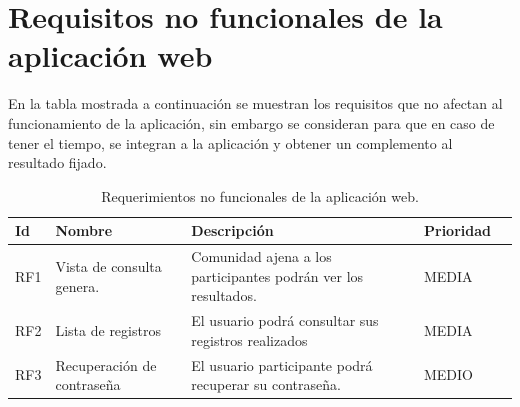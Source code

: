 \section{Requisitos no funcionales de la aplicación web}
En la tabla mostrada a continuación se muestran los requisitos que no afectan al funcionamiento de la aplicación, sin embargo se consideran para que en caso de tener el tiempo, se integran a la aplicación y obtener un complemento al resultado fijado.
\begin{table}[htbp]
	\begin{center}
		\begin{tabular}{|l|p{45mm}|p{45mm}|p{45mm}|l}
			\hline
			Id & Nombre & Descripción & Prioridad \\
			\hline 
			RF1 & Vista de consulta genera. & Comunidad ajena a los participantes podrán ver los resultados. & MEDIA \\ \hline
			RF2 & Lista de registros &El usuario podrá consultar sus registros realizados & MEDIA   \\ \hline
			RF3 & Recuperación de contraseña &El usuario participante podrá recuperar su contraseña. & MEDIO \\ \hline
		\end{tabular}
		\caption{Requerimientos no funcionales de la aplicación web.}
		\label{tabla:sencilla}
	\end{center}
\end{table}
\pagebreak

